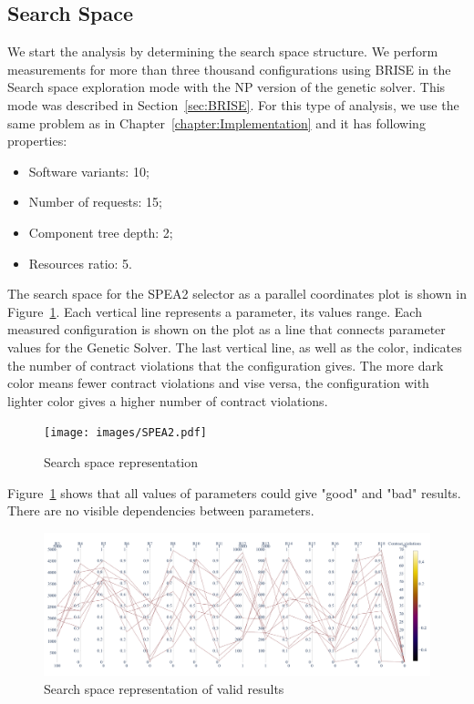 \subsection{Search Space}

We start the analysis by determining the search space structure. We perform measurements for more than three thousand configurations using BRISE in the Search space exploration mode with the NP version of the genetic solver. This mode was described in Section~\ref{sec:BRISE}. For this type of analysis, we use the same problem as in Chapter~\ref{chapter:Implementation} and it has following properties:
\begin{itemize}
	\item Software variants: 10;
	\item Number of requests: 15;
	\item Component tree depth: 2;
	\item Resources ratio: 5.
\end{itemize}

The search space for the SPEA2 selector as a parallel coordinates plot is shown in Figure~\ref{fig:SearchSpaceViewFull}.
Each vertical line represents a parameter, its values range. Each measured configuration is shown on the plot as a line that connects parameter values for the Genetic Solver. The last vertical line, as well as the color, indicates the number of contract violations that the configuration gives. The more dark color means fewer contract violations and vise versa, the configuration with lighter color gives a higher number of contract violations.

\begin{figure}
	\centering
	\texttt{[image: images/SPEA2.pdf]}
	\caption[Search space representation]{Search space representation}
	\label{fig:SearchSpaceViewFull}
\end{figure}

Figure~\ref{fig:SearchSpaceViewFull} shows that all values of parameters could give "good" and "bad" results. There are no visible dependencies between parameters. 

\begin{figure}
	\centering
	\includegraphics[width=\textwidth]{images/SPEA2_Zero_validity.html.pdf}
	\caption[Search space representation of valid results]{Search space representation of valid results}
	\label{fig:SearchSpaceValid}
\end{figure}

